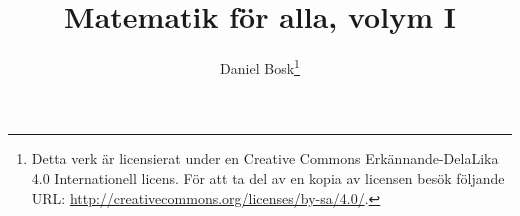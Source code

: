 \documentclass[a4paper,titlepage,reqno,final,twoside]{amsbook}
\theoremstyle{definition}
\theoremstyle{remark}
\numberwithin{section}{chapter}
\numberwithin{equation}{chapter}
\numberwithin{figure}{chapter}
\numberwithin{table}{chapter}
\begin{document}

\title{%
  Matematik för alla, volym I
}
\author{%
  Daniel Bosk\footnote{%
    Detta verk är licensierat under en Creative Commons Erkännande-DelaLika 4.0 
    Internationell licens.
    För att ta del av en kopia av licensen besök följande URL\@:
    \url{http://creativecommons.org/licenses/by-sa/4.0/}.
  }
}

\frontmatter



\mainmatter{}
\ifdraft{%
  \onehalfspacing{}
}{}


















%


%

\appendix
\ifdraft{%
  \doublespacing{}
}{}


\backmatter{}
\ifdraft{%
  \singlespacing{}
}{}
\printbibliography{}
\listoffigures
\listoftables
\printindex


\clearpage
\end{document}
